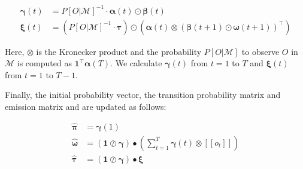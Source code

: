 \begin{align}
    \pmb{\gamma}(t) & = P[O | \mathcal{M}]^{-1} \cdot \pmb{\alpha}(t) \odot \pmb{\beta}(t)                                                                                 \\
    \pmb{\xi}(t)    & = (P[O | \mathcal{M}]^{-1} \cdot \pmb{\tau}) \odot \left( \pmb{\alpha}(t) \otimes \left(\pmb{\beta}(t+1) \odot \pmb{\omega}(t+1)\right)^\top \right)
\end{align}


Here, $\otimes$ is the Kronecker product and the probability $P[O | \mathcal{M}]$ to observe $O$ in $\mathcal{M}$ is computed as $\mathbf{1}^\top \pmb{\alpha}(T)$.
We calculate $\pmb{\gamma}(t)$ from $t= 1$ to $T$ and $\pmb{\xi}(t)$ from $t= 1$ to $T-1$.

Finally, the initial probability vector, the transition probability matrix and emission matrix and are updated as follows:


\begin{align}
    \hat{\pmb{\pi}}    & = \pmb{\gamma}(1)
    \label{eq:initial-probabilities-update}                                                                                               \\
    \hat{\pmb{\omega}} & = ( \mathbf{1} \oslash \pmb{\gamma}) \smblkcircle \left(\sum_{t=1}^{T} \pmb{\gamma}(t) \otimes {[[o_t]]} \right)
    \label{eq:emission-probabilities-update}                                                                                              \\
    \hat{\pmb{\tau}}   & = (\mathbf{1} \oslash \pmb{\gamma} ) \smblkcircle \pmb{\xi}
    \label{eq:transition-probabilities-update}
\end{align}






